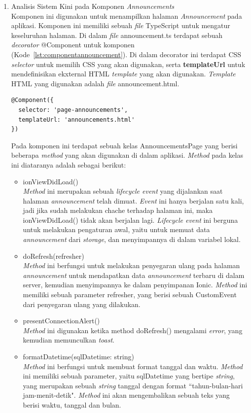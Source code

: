 \begin{enumerate}
	\begin{enumerate}
		\item Analisis Sistem Kini pada Komponen \textit{Announcements} \\
		Komponen ini digunakan untuk menampilkan halaman \textit{Announcement} pada aplikasi. Komponen ini memiliki sebuah \textit{file} TypeScript untuk mengatur keseluruhan halaman. Di dalam \textit{file} announcement.ts terdapat sebuah \textit{decorator} @Component untuk komponen (Kode~\ref{lst:componentannouncement}). Di dalam decorator ini terdapat CSS \textit{selector} untuk memilih CSS yang akan digunakan, serta \textbf{templateUrl} untuk mendefinisikan ekxternal HTML \textit{template} yang akan digunakan. \textit{Template} HTML yang digunakan adalah \textit{file} announcement.html. 
		\newpage
\begin{lstlisting}[label={lst:componentannouncement}, caption=@Component pada annoncement.ts]
@Component({
  selector: 'page-announcements',
  templateUrl: 'announcements.html'
})
\end{lstlisting} 
	Pada komponen ini terdapat sebuah kelas AnnouncementsPage yang berisi beberapa \textit{method} yang akan digunakan di dalam aplikasi. \textit{Method} pada kelas ini diataranya adalah sebagai berikut:
	\begin{itemize}
		\item ionViewDidLoad() \\
		\textit{Method} ini merupakan sebuah \textit{lifecycle event} yang dijalankan saat halaman \textit{announcement} telah dimuat. \textit{Event} ini hanya berjalan satu kali, jadi jika sudah melakukan chache terhadap halaman ini, maka ionViewDidLoad() tidak akan berjalan lagi. \textit{Lifecycle event} ini berguna untuk melakukan pengaturan awal, yaitu untuk memuat data \textit{announcement} dari \textit{storage}, dan menyimpannya di dalam variabel lokal. 
		\item doRefresh(refresher) \\
		\textit{Method} ini berfungsi untuk melakukan penyegaran ulang pada halaman \textit{announcement} untuk mendapatkan data \textit{announcement} terbaru di dalam server, kemudian menyimpannya ke dalam penyimpanan Ionic. \textit{Method} ini memiliki sebuah parameter refresher, yang berisi sebuah CustomEvent dari penyegaran ulang yang dilakukan.
		\item presentConnectionAlert() \\
		\textit{Method} ini digunakan ketika method doRefresh() mengalami \textit{error}, yang kemudian memunculkan \textit{toast}.
		\item formatDatetime(sqlDatetime: string) \\
		\textit{Method} ini berfungsi untuk membuat format tanggal dan waktu. \textit{Method} ini memiliki sebuah parameter, yaitu sqlDatetime yang bertipe \textit{string}, yang merupakan sebuah \textit{string} tanggal dengan format ``tahun-bulan-hari jam-menit-detik". \textit{Method} ini akan mengembalikan sebuah teks yang berisi waktu, tanggal dan bulan.
	\end{itemize}


\end{enumerate}
\end{enumerate}
